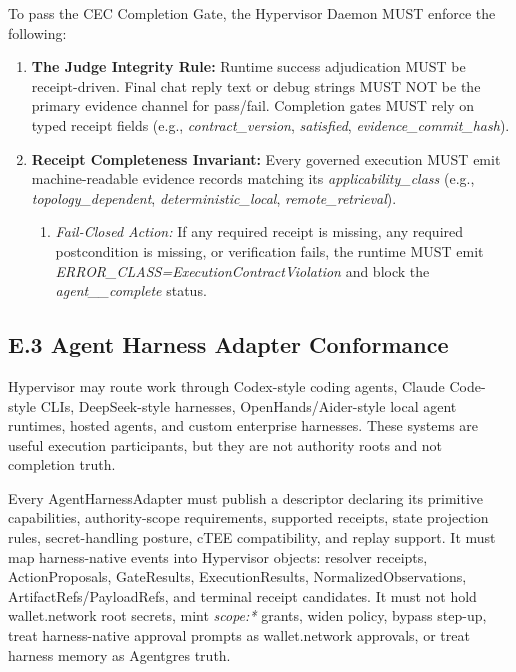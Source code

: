 \documentclass[
  11pt,
]{article}
\providecommand{\tightlist}{%
  \setlength{\itemsep}{0pt}\setlength{\parskip}{0pt}}
\begin{document}
To pass the CEC Completion Gate, the Hypervisor Daemon MUST enforce the
following:

\begin{enumerate}
\def\labelenumi{\arabic{enumi}.}
\item
  \textbf{The Judge Integrity Rule:} Runtime success adjudication MUST
  be receipt-driven. Final chat reply text or debug strings MUST NOT be
  the primary evidence channel for pass/fail. Completion gates MUST rely
  on typed receipt fields (e.g., \emph{contract\_version},
  \emph{satisfied}, \emph{evidence\_commit\_hash}).
\item
  \textbf{Receipt Completeness Invariant:} Every governed execution MUST
  emit machine-readable evidence records matching its
  \emph{applicability\_class} (e.g., \emph{topology\_dependent},
  \emph{deterministic\_local}, \emph{remote\_retrieval}).

  \begin{enumerate}
  \def\labelenumii{\arabic{enumii}.}
  \tightlist
  \item
    \emph{Fail-Closed Action:} If any required receipt is missing, any
    required postcondition is missing, or verification fails, the
    runtime MUST emit \emph{ERROR\_CLASS=\allowbreak{}Execution\allowbreak{}Contract\allowbreak{}Violation} and
    block the \emph{agent\_\_complete} status.
  \end{enumerate}
\end{enumerate}

\hypertarget{e.3-agent-harness-adapter-conformance}{%
\subsection{E.3 Agent Harness Adapter
Conformance}\label{e.3-agent-harness-adapter-conformance}}

Hypervisor may route work through Codex-style coding agents, Claude
Code-style CLIs, DeepSeek-style harnesses, OpenHands/Aider-style local
agent runtimes, hosted agents, and custom enterprise harnesses. These systems
are useful execution participants,
but they are not authority roots and not completion truth.

Every AgentHarnessAdapter must publish a descriptor declaring its
primitive capabilities, authority-scope requirements, supported receipts,
state projection rules, secret-handling posture, cTEE compatibility, and
replay support. It must map harness-native events into Hypervisor
objects: resolver receipts, ActionProposals, GateResults,
ExecutionResults, NormalizedObservations, ArtifactRefs/PayloadRefs, and
terminal receipt candidates. It must not hold wallet.network root
secrets, mint \emph{scope:*} grants, widen policy, bypass step-up, treat
harness-native approval prompts as wallet.network approvals, or treat
harness memory as Agentgres truth.
\end{document}
